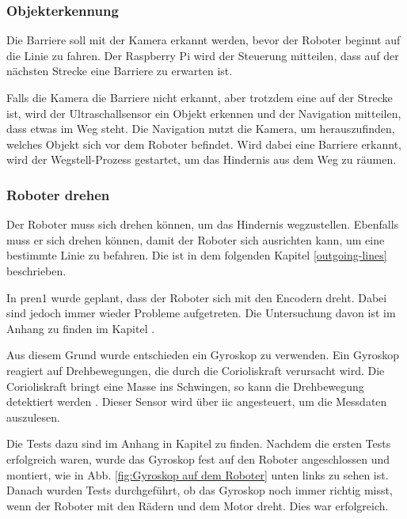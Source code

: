\subsubsection{Objekterkennung}

Die Barriere soll mit der Kamera erkannt werden, bevor der Roboter beginnt auf die Linie zu fahren. Der Raspberry Pi wird der Steuerung mitteilen, dass auf der nächsten Strecke eine Barriere zu erwarten ist.

Falls die Kamera die Barriere nicht erkannt, aber trotzdem eine auf der Strecke ist, wird der Ultraschallsensor ein Objekt erkennen und der Navigation mitteilen, dass etwas im Weg steht. Die Navigation nutzt die Kamera, um herauszufinden, welches Objekt sich vor dem Roboter befindet. Wird dabei eine Barriere erkannt, wird der Wegstell-Prozess gestartet, um das Hindernis aus dem Weg zu räumen.

\subsubsection{Roboter drehen}

Der Roboter muss sich drehen können, um das Hindernis wegzustellen. Ebenfalls muss er sich drehen können, damit der Roboter sich ausrichten kann, um eine bestimmte Linie zu befahren. Die ist in dem folgenden Kapitel \ref{outgoing-lines} beschrieben.

In \acrshort{pren1} wurde geplant, dass der Roboter sich mit den Encodern dreht. Dabei sind jedoch immer wieder Probleme aufgetreten. Die Untersuchung davon ist im Anhang zu finden im Kapitel .

Aus diesem Grund wurde entschieden ein Gyroskop zu verwenden.
 Ein Gyroskop reagiert auf Drehbewegungen, die durch die Corioliskraft verursacht wird. Die Corioliskraft bringt eine Masse ins Schwingen, so kann die Drehbewegung detektiert werden \parencite{zielke2025}. Dieser Sensor wird über \acrshort{iic} angesteuert, um die Messdaten auszulesen. 

Die Tests dazu sind im Anhang in Kapitel  zu finden. Nachdem die ersten Tests erfolgreich waren, wurde das Gyroskop fest auf den Roboter angeschlossen und montiert, wie in Abb. \ref{fig:Gyroskop auf dem Roboter} unten links zu sehen ist. Danach wurden Tests durchgeführt, ob das Gyroskop noch immer richtig misst, wenn der Roboter mit den Rädern und dem Motor dreht. Dies war erfolgreich.


